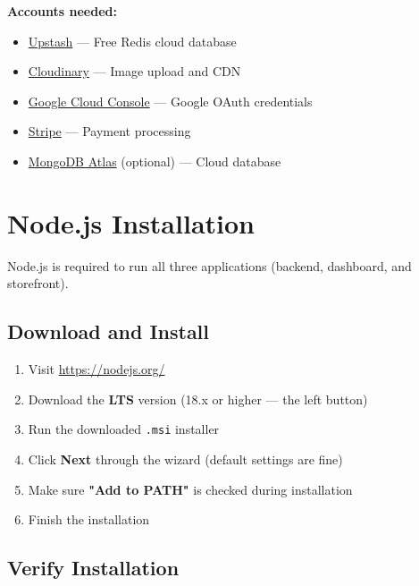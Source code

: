 \documentclass[12pt,a4paper]{article}
\begin{document}
\vspace{0.5cm}

\textbf{Accounts needed:}
\begin{itemize}
    \item \href{https://upstash.com/}{Upstash} — Free Redis cloud database
    \item \href{https://cloudinary.com/}{Cloudinary} — Image upload and CDN
    \item \href{https://console.cloud.google.com/}{Google Cloud Console} — Google OAuth credentials
    \item \href{https://stripe.com/}{Stripe} — Payment processing
    \item \href{https://www.mongodb.com/atlas}{MongoDB Atlas} (optional) — Cloud database
\end{itemize}

\newpage

\section{Node.js Installation}

Node.js is required to run all three applications (backend, dashboard, and storefront).

\subsection{Download and Install}

\begin{enumerate}[leftmargin=*,itemsep=0.5em]
    \item Visit \url{https://nodejs.org/}
    \item Download the \textbf{LTS} version (18.x or higher — the left button)
    \item Run the downloaded \texttt{.msi} installer
    \item Click \textbf{Next} through the wizard (default settings are fine)
    \item Make sure \textbf{"Add to PATH"} is checked during installation
    \item Finish the installation
\end{enumerate}

\subsection{Verify Installation}
\end{document}
